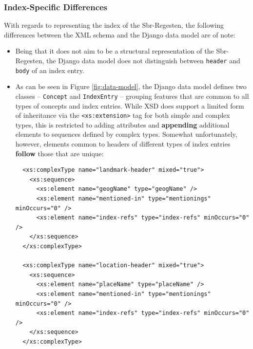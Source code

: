 \subsubsection{Index-Specific Differences}
\label{sec:index-model}

With regards to representing the index of the Sbr-Regesten, the
following differences between the XML schema and the Django data model
are of note:

\begin{itemize}
\item Being that it does not aim to be a structural representation of
  the Sbr-Regesten, the Django data model does not distinguish between
  \texttt{header} and \texttt{body} of an index entry.
\item As can be seen in Figure \ref{fig:data-model}, the Django data
  model defines two classes -- \texttt{Concept} and
  \texttt{IndexEntry} -- grouping features that are common to all
  types of concepts and index entries. While XSD does support a
  limited form of inheritance via the \texttt{<xs:extension>} tag for
  both simple and complex types, this is restricted to adding
  attributes and \textbf{appending} additional elements to sequences
  defined by complex types. Somewhat unfortunately, however, elements
  common to headers of different types of index entries
  \textbf{follow} those that are unique:

\begin{verbatim}
  <xs:complexType name="landmark-header" mixed="true">
    <xs:sequence>
      <xs:element name="geogName" type="geogName" />
      <xs:element name="mentioned-in" type="mentionings" minOccurs="0" />
      <xs:element name="index-refs" type="index-refs" minOccurs="0" />
    </xs:sequence>
  </xs:complexType>

  <xs:complexType name="location-header" mixed="true">
    <xs:sequence>
      <xs:element name="placeName" type="placeName" />
      <xs:element name="mentioned-in" type="mentionings" minOccurs="0" />
      <xs:element name="index-refs" type="index-refs" minOccurs="0" />
    </xs:sequence>
  </xs:complexType>
\end{verbatim}


\end{itemize}
